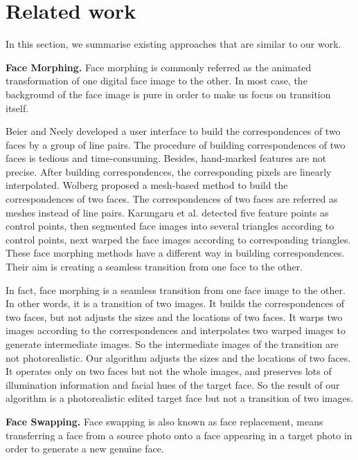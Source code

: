 \section{Related work}
In this section, we summarise existing approaches that are similar to our work.

\textbf{Face Morphing.} Face morphing is commonly referred as the animated transformation of one digital face image to the other. In most case, the background of the face image is pure in order to make us focus on transition itself.

 Beier and Neely \cite{fbim} developed a user interface to build the correspondences of two faces by a group of line pairs. The procedure of building correspondences of two faces is tedious and time-consuming. Besides, hand-marked features are not precise. After building correspondences, the corresponding pixels are linearly interpolated.  Wolberg \cite{wol} proposed a mesh-based method to build the correspondences of two faces. The correspondences of two faces are referred as meshes instead of line pairs. Karungaru et al. \cite{mhf} detected five feature points as control points, then segmented face images into several triangles according to control points, next warped the face images according to corresponding triangles. These face morphing methods have a different way in building correspondences. Their aim is creating a seamless transition from one face to the other.

 In fact, face morphing is a seamless transition from one face image to the other. In other words, it is a transition of two images. It builds the correspondences of two faces, but not adjusts the sizes and the locations of two faces. It warps two images according to the correspondences and interpolates two warped images to generate intermediate images. So the intermediate images of the transition are not photorealistic. Our algorithm adjusts  the sizes and the locations of two faces. It operates only on two faces but not the whole images, and preserves lots of illumination information and facial hues of the target face. So the result of our algorithm is a photorealistic edited target face but not a transition of two images.

\textbf{Face Swapping.} Face swapping is also known as face replacement, means transferring a face from a source photo onto a face appearing in a target photo in order to generate a new genuine face.

